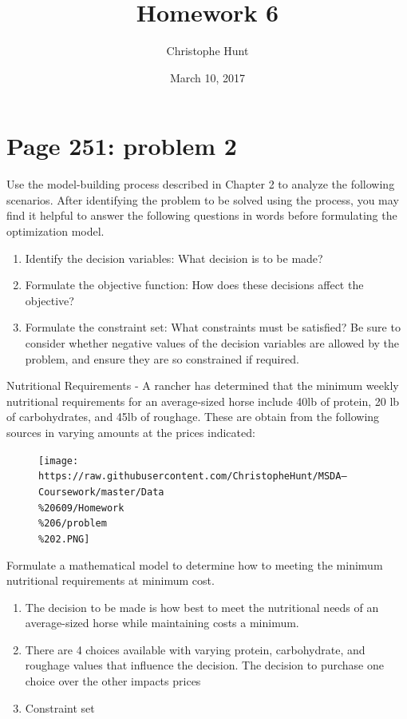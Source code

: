 \documentclass[]{article}
\title{Homework 6}
\author{Christophe Hunt}
\date{March 10, 2017}
\providecommand{\tightlist}{%
  \setlength{\itemsep}{0pt}\setlength{\parskip}{0pt}}
\begin{document}
\maketitle

{
\setcounter{tocdepth}{2}
\tableofcontents
}
\newpage

\section{Page 251: problem 2}\label{page-251-problem-2}

Use the model-building process described in Chapter 2 to analyze the
following scenarios. After identifying the problem to be solved using
the process, you may find it helpful to answer the following questions
in words before formulating the optimization model.

\begin{enumerate}
\def\labelenumi{\alph{enumi}.}
\tightlist
\item
  Identify the decision variables: What decision is to be made?
\item
  Formulate the objective function: How does these decisions affect the
  objective?
\item
  Formulate the constraint set: What constraints must be satisfied? Be
  sure to consider whether negative values of the decision variables are
  allowed by the problem, and ensure they are so constrained if
  required.
\end{enumerate}

Nutritional Requirements - A rancher has determined that the minimum
weekly nutritional requirements for an average-sized horse include 40lb
of protein, 20 lb of carbohydrates, and 45lb of roughage. These are
obtain from the following sources in varying amounts at the prices
indicated:

\begin{figure}[htbp]
\centering
\texttt{[image: https://raw.githubusercontent.com/ChristopheHunt/MSDA---Coursework/master/Data\\\%20609/Homework\\\%206/problem\\\%202.PNG]}
\caption{}
\end{figure}

Formulate a mathematical model to determine how to meeting the minimum
nutritional requirements at minimum cost.

\begin{enumerate}
\def\labelenumi{\alph{enumi}.}
\item
  The decision to be made is how best to meet the nutritional needs of
  an average-sized horse while maintaining costs a minimum.
\item
  There are 4 choices available with varying protein, carbohydrate, and
  roughage values that influence the decision. The decision to purchase
  one choice over the other impacts prices
\item
  Constraint set
\end{enumerate}
\end{document}
